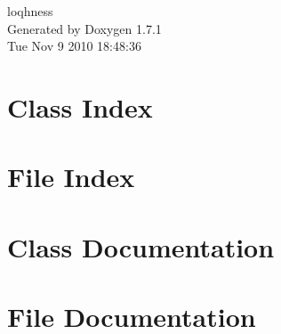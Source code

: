 \documentclass[a4paper]{book}
\begin{document}
\hypersetup{pageanchor=false}
\begin{titlepage}
\vspace*{7cm}
\begin{center}
{\Large loqhness }\\
\vspace*{1cm}
{\large Generated by Doxygen 1.7.1}\\
\vspace*{0.5cm}
{\small Tue Nov 9 2010 18:48:36}\\
\end{center}
\end{titlepage}
\clearemptydoublepage
{}
\tableofcontents
\clearemptydoublepage
{}
\hypersetup{pageanchor=true}
\chapter{Class Index}

\chapter{File Index}

\chapter{Class Documentation}




\chapter{File Documentation}





















\printindex
\end{document}
